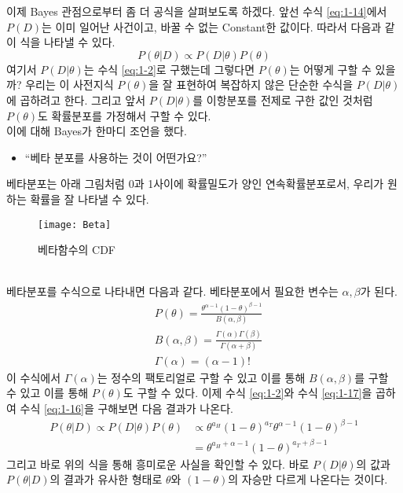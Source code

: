 \documentclass[a4paper]{oblivoir}
\begin{document}
\indent 이제 Bayes 관점으로부터 좀 더 공식을 살펴보도록 하겠다. 앞선 수식 \eqref{eq:1-14}에서 $P(D)$는 이미 일어난 사건이고, 바꿀 수 없는 Constant한 값이다. 따라서 다음과 같이 식을 나타낼 수 있다.
\begin{equation}
P(\theta| D)\propto P(D| \theta)P(\theta)
\label{eq:1-16}
\end{equation}
여기서 $P(D| \theta)$는 수식 \eqref{eq:1-2}로 구했는데 그렇다면 $P(\theta)$는 어떻게 구할 수 있을까?
우리는 이 사전지식 $P(\theta)$을 잘 표현하여 복잡하지 않은 단순한 수식을 $P(D| \theta)$에 곱하려고 한다. 그리고 앞서 $P(D| \theta)$를 이항분포를 전제로 구한 값인 것처럼 $P(\theta)$도 확률분포를 가정해서 구할 수 있다.\\
이에 대해 Bayes가 한마디 조언을 했다.
\begin{itemize}
\item ``베타 분포를 사용하는 것이 어떤가요?''
\end{itemize}
베타분포는 아래 그림처럼 0과 1사이에 확률밀도가 양인 연속확률분포로서, 우리가 원하는 확률을 잘 나타낼 수 있다.
\begin{figure}[ht]\centering
\texttt{[image: Beta]}\caption{베타함수의 CDF}\label{Fig:1-19}
\end{figure}\\
베타분포를 수식으로 나타내면 다음과 같다. 베타분포에서 필요한 변수는 $\alpha, \beta$가 된다.
\begin{align}
&P(\theta)=\frac{\theta^{\alpha-1}(1-\theta)^{\beta-1}}{B(\alpha ,\beta)}\label{eq:1-17}\\
&B(\alpha ,\beta)=\frac{\Gamma(\alpha)\Gamma(\beta)}{\Gamma(\alpha+\beta)}\label{eq:1-18}\\
&\Gamma(\alpha)=(\alpha -1)!\label{eq:1-19}
\end{align}
이 수식에서 $\Gamma(\alpha)$는 정수의 팩토리얼로 구할 수 있고 이를 통해 $B(\alpha,\beta)$를 구할 수 있고 이를 통해 $P(\theta)$도 구할 수 있다.
이제 수식 \eqref{eq:1-2}와 수식 \eqref{eq:1-17}을 곱하여 수식 \eqref{eq:1-16}을 구해보면 다음 결과가 나온다.
\begin{align}
P(\theta| D)\propto P(D| \theta)P(\theta)&\propto \theta^{a_H}(1-\theta)^{a_T}\theta^{\alpha-1}(1-\theta)^{\beta-1}\label{eq:1-20}\\
&=\theta^{a_H+\alpha-1}(1-\theta)^{a_T+\beta-1}\label{eq:1-21}
\end{align}
그리고 바로 위의 식을 통해 흥미로운 사실을 확인할 수 있다. 바로 $P(D| \theta)$의 값과 $P(\theta| D)$의 결과가 유사한 형태로 $\theta$와 $(1-\theta)$의 자승만 다르게 나온다는 것이다.\\
\end{document}
